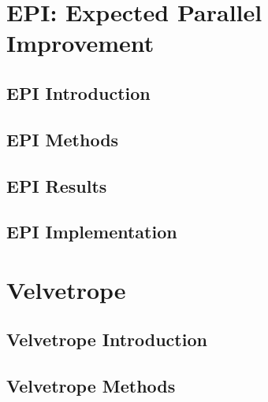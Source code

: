 \documentclass[phd,tocprelim]{cornell}
\begin{document}
\part{EPI: Expected Parallel Improvement} %
\label{prt:EPI: Expected Parallel Improvement}

\chapter{EPI Introduction} %
\label{cha:EPI Introduction}


\chapter{EPI Methods} %
\label{cha:EPI Methods}


\chapter{EPI Results} %
\label{cha:EPI Results}


\chapter{EPI Implementation} %
\label{cha:EPI Implementation}



\part{Velvetrope} %
\label{prt:Velvetrope}

\chapter{Velvetrope Introduction} %
\label{cha:Velvetrope Introduction}


\chapter{Velvetrope Methods} %
\label{cha:Velvetrope Methods}
\end{document}
